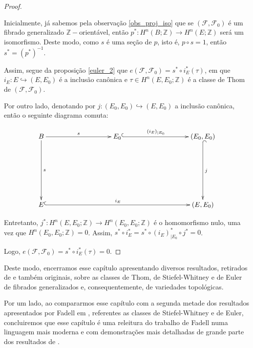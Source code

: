 \documentclass[12pt,oneside]{book} %
\newcommand{\Z}{\mathbb{Z}}
\begin{document}
\begin{proof}
	
	\
	
	\par Inicialmente, já sabemos pela observação \ref{obs_proj_iso} que se $(\mathcal{F},\mathcal{F}_{0})$ é um fibrado generalizado $\Z-$orientável, então $p^{*}:H^{n}(B;\Z)\to H^{n}(E;\Z)$ será um isomorfismo. Deste modo, como $s$ é uma seção de $p$, isto é, $p\circ s=1$, então $s^{*}=(p^{*})^{-1}$.
	
	\par Assim, segue da proposição \ref{euler_2} que $e(\mathcal{F},\mathcal{F}_{0})=s^{*}\circ i_{E}^{*}(\tau)$, em que $i_{E}:E\hookrightarrow (E,E_{0})$ é a inclusão canônica e $\tau\in H^{n}(E,E_{0};\Z)$ é a classe de Thom de $(\mathcal{F},\mathcal{F}_{0})$.
	
	\par Por outro lado, denotando por $j:(E_{0},E_{0})\hookrightarrow (E,E_{0})$ a inclusão canônica, então o seguinte diagrama comuta:
	
	$$ \xymatrix @C=0.5cm {
		B \ar[rrrrr]^-{s} \ar[ddd]^-{s} &&&&& E_{0} \ar@{^(->}[rrrrr]^-{(i_{E})_{|E_{0}}} &&&&& (E_{0},E_{0}) \ar@{^(->}[ddd]^-{j} \\
		&&&&& &&&&& \\
		&&&&& &&&&& \\		 
		E \ar@{^(->}[rrrrrrrrrr]^-{i_{E}} &&&&& &&&&& (E,E_{0})
	} $$
	
	\par Entretanto, $j^{*}:H^{n}(E,E_{0};\Z)\to H^{n}(E_{0},E_{0};\Z)$ é o homomorfismo nulo, uma vez que $H^{n}(E_{0},E_{0};\Z)=0$. Assim, $s^{*}\circ i_{E}^{*}=s^{*}\circ (i_{E})_{|E_{0}}^{*}\circ j^{*}=0$.
	
	\par Logo, $e(\mathcal{F},\mathcal{F}_{0})=s^{*}\circ i_{E}^{*}(\tau)=0$.
	
\end{proof}

\par Deste modo, encerramos esse capítulo apresentando diversos resultados, retirados de \cite{fadell_1} e também originais, sobre as classes de Thom, de Stiefel-Whitney e de Euler de fibrados generalizados e, consequentemente, de variedades topológicas.

\par Por um lado, ao compararmos esse capítulo com a segunda metade dos resultados apresentados por Fadell em \cite{fadell_1}, referentes as classes de Stiefel-Whitney e de Euler, concluiremos que esse capítulo é uma releitura do trabalho de Fadell numa linguagem mais moderna e com demonstrações mais detalhadas de grande parte dos resultados de \cite{fadell_1}.
\end{document}
